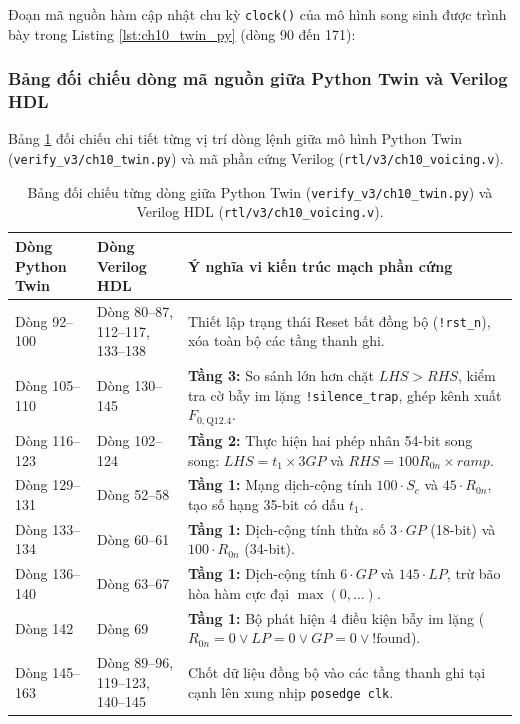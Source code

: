 Đoạn mã nguồn hàm cập nhật chu kỳ \texttt{clock()} của mô hình song sinh được trình bày trong Listing \ref{lst:ch10_twin_py} (dòng 90 đến 171):



\subsubsection*{Bảng đối chiếu dòng mã nguồn giữa Python Twin và Verilog HDL}
Bảng \ref{tab:ch10_twin_vs_hdl} đối chiếu chi tiết từng vị trí dòng lệnh giữa mô hình Python Twin (\texttt{verify\_v3/ch10\_twin.py}) và mã phần cứng Verilog (\texttt{rtl/v3/ch10\_voicing.v}).

\begin{table}[htbp]
\centering
\small
\caption{Bảng đối chiếu từng dòng giữa Python Twin (\texttt{verify\_v3/ch10\_twin.py}) và Verilog HDL (\texttt{rtl/v3/ch10\_voicing.v}).}
\label{tab:ch10_twin_vs_hdl}
\begin{tabular}{p{3.8cm}p{3.8cm}p{7.2cm}}
\toprule
\textbf{Dòng Python Twin} & \textbf{Dòng Verilog HDL} & \textbf{Ý nghĩa vi kiến trúc mạch phần cứng} \\
\midrule
Dòng 92--100 & Dòng 80--87, 112--117, 133--138 & Thiết lập trạng thái Reset bất đồng bộ (\texttt{!rst\_n}), xóa toàn bộ các tầng thanh ghi. \\
Dòng 105--110 & Dòng 130--145 & \textbf{Tầng 3:} So sánh lớn hơn chặt $LHS > RHS$, kiểm tra cờ bẫy im lặng \texttt{!silence\_trap}, ghép kênh xuất $F_{0,\text{Q12.4}}$. \\
Dòng 116--123 & Dòng 102--124 & \textbf{Tầng 2:} Thực hiện hai phép nhân 54-bit song song: $LHS = t_1 \times 3GP$ và $RHS = 100R_{0n} \times ramp$. \\
Dòng 129--131 & Dòng 52--58 & \textbf{Tầng 1:} Mạng dịch-cộng tính $100\cdot S_c$ và $45\cdot R_{0n}$, tạo số hạng 35-bit có dấu $t_1$. \\
Dòng 133--134 & Dòng 60--61 & \textbf{Tầng 1:} Dịch-cộng tính thừa số $3\cdot GP$ (18-bit) và $100\cdot R_{0n}$ (34-bit). \\
Dòng 136--140 & Dòng 63--67 & \textbf{Tầng 1:} Dịch-cộng tính $6\cdot GP$ và $145\cdot LP$, trừ bão hòa hàm cực đại $\max(0, \dots)$. \\
Dòng 142 & Dòng 69 & \textbf{Tầng 1:} Bộ phát hiện 4 điều kiện bẫy im lặng ($R_{0n}=0 \lor LP=0 \lor GP=0 \lor !\text{found}$). \\
Dòng 145--163 & Dòng 89--96, 119--123, 140--145 & Chốt dữ liệu đồng bộ vào các tầng thanh ghi tại cạnh lên xung nhịp \texttt{posedge clk}. \\
\bottomrule
\end{tabular}
\end{table}

